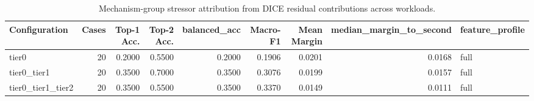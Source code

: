 \begin{table}[t]
\centering
\caption{Mechanism-group stressor attribution from DICE residual contributions across workloads.}
\label{tab:dice_stressor_diagnosis}
\footnotesize
\begin{tabular}{lrrrrrrrl}
\toprule
Configuration & Cases & Top-1 Acc. & Top-2 Acc. & balanced_acc & Macro-F1 & Mean Margin & median_margin_to_second & feature_profile \\
\midrule
tier0 & 20 & 0.2000 & 0.5500 & 0.2000 & 0.1906 & 0.0201 & 0.0168 & full \\
tier0_tier1 & 20 & 0.3500 & 0.7000 & 0.3500 & 0.3076 & 0.0199 & 0.0157 & full \\
tier0_tier1_tier2 & 20 & 0.3500 & 0.5500 & 0.3500 & 0.3370 & 0.0149 & 0.0111 & full \\
\bottomrule
\end{tabular}

\end{table}

